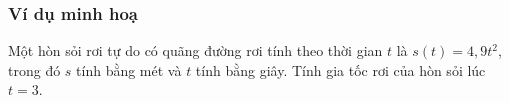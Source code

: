 \subsubsection{Ví dụ minh hoạ}
\begin{vd}%
	Một hòn sỏi rơi tự do có quãng đường rơi tính theo thời gian $t$ là $s(t)=4,9 t^2$, trong đó $s$ tính bằng mét và $t$ tính bằng giây. Tính gia tốc rơi của hòn sỏi lúc $t=3$.
\end{vd}

